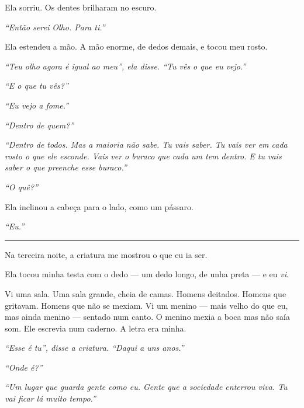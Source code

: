 \noindent Ela sorriu. Os dentes brilharam no escuro.

\noindent \textit{\textquotedblleft{}Então serei Olho. Para ti.\textquotedblright{}}

\noindent Ela estendeu a mão. A mão enorme, de dedos demais, e tocou meu rosto.

\noindent \textit{\textquotedblleft{}Teu olho agora é igual ao meu\textquotedblright{}\textit{, ela disse. }\textquotedblleft{}Tu vês o que eu vejo.\textquotedblright{}}

\noindent \textit{\textquotedblleft{}E o que tu vês?\textquotedblright{}}

\noindent \textit{\textquotedblleft{}Eu vejo a fome.\textquotedblright{}}

\noindent \textit{\textquotedblleft{}Dentro de quem?\textquotedblright{}}

\noindent \textit{\textquotedblleft{}Dentro de todos. Mas a maioria não sabe. Tu vais saber. Tu vais ver em cada rosto o que ele esconde. Vais ver o buraco que cada um tem dentro. E tu vais saber o que preenche esse buraco.\textquotedblright{}}

\noindent \textit{\textquotedblleft{}O quê?\textquotedblright{}}

\noindent Ela inclinou a cabeça para o lado, como um pássaro.

\noindent \textit{\textquotedblleft{}Eu.\textquotedblright{}}

\vspace{0.5em}\noindent\rule{\textwidth}{0.5pt}\vspace{0.5em}

\noindent Na terceira noite, a criatura me mostrou o que eu ia ser.

\noindent Ela tocou minha testa com o dedo --- um dedo longo, de unha preta --- e eu \textit{vi}.

\noindent Vi uma sala. Uma sala grande, cheia de camas. Homens deitados. Homens que gritavam. Homens que não se mexiam. Vi um menino --- mais velho do que eu, mas ainda menino --- sentado num canto. O menino mexia a boca mas não saía som. Ele escrevia num caderno. A letra era minha.

\noindent \textit{\textquotedblleft{}Esse é tu\textquotedblright{}\textit{, disse a criatura. }\textquotedblleft{}Daqui a uns anos.\textquotedblright{}}

\noindent \textit{\textquotedblleft{}Onde é?\textquotedblright{}}

\noindent \textit{\textquotedblleft{}Um lugar que guarda gente como eu. Gente que a sociedade enterrou viva. Tu vai ficar lá muito tempo.\textquotedblright{}}

